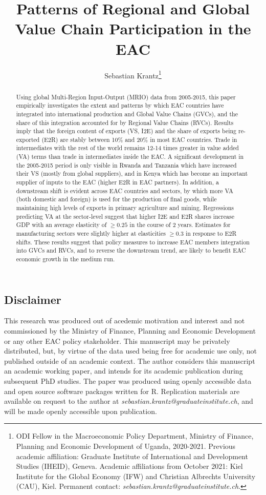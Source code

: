 \documentclass[a4paper]{article}
\title{\textbf{Patterns of Regional and Global Value Chain Participation in the EAC}}
\author{Sebastian Krantz\footnote{ODI Fellow in the Macroeconomic Policy Department, Ministry of Finance, Planning and Economic Development of Uganda, 2020-2021. Previous academic affiliation: Graduate Institute of International and Development Studies (IHEID), Geneva. Academic affiliations from October 2021: Kiel Institute for the Global Economy (IFW) and Christian Albrechts University (CAU), Kiel. Permanent contact: \emph{sebastian.krantz@graduateinstitute.ch}.}}
\begin{document}
\maketitle

\begin{abstract}
Using global Multi-Region Input-Output (MRIO) data from 2005-2015, this paper empirically investigates the extent and patterns by which EAC countries have integrated into international production and Global Value Chains (GVCs), and the share of this integration accounted for by Regional Value Chains (RVCs). Results imply that the foreign content of exports (VS, I2E) and the share of exports being re-exported (E2R) are stably between 10\% and 20\% in most EAC countries. Trade in intermediates with the rest of the world remains 12-14 times greater in value added (VA) terms than trade in intermediates inside the EAC. A significant development in the 2005-2015 period is only visible in Rwanda and Tanzania which have increased their VS (mostly from global suppliers), and in Kenya which has become an important supplier of inputs to the EAC (higher E2R in EAC partners). In addition, a downstream shift is evident across EAC countries and sectors, by which more VA (both domestic and foreign) is used for the production of final goods, while maintaining high levels of exports in primary agriculture and mining. Regressions predicting VA at the sector-level suggest that higher I2E and E2R shares increase GDP with an average elasticity of $\geq 0.25$ in the course of 2 years. Estimates for manufacturing sectors were slightly higher at elasticities $\geq 0.3$ in response to E2R shifts. These results suggest that policy measures to increase EAC members integration into GVCs and RVCs, and to reverse the downstream trend, are likely to benefit EAC economic growth in the medium run.  
\end{abstract}

\vspace{4.8cm}

\subsection*{Disclaimer}
This research was produced out of acedemic motivation and interest and not commissioned by the  Ministry of Finance, Planning and Economic Development or any other EAC policy stakeholder. This manuscript may be privately distributed, but, by virtue of the data used being free for academic use only, not published outside of an academic context. The author considers this manuscript an academic working paper, and intends for its academic publication during subsequent PhD studies. The paper was produced using openly accessible data and open source software packages written for R. Replication materials are available on request to the author at  \emph{sebastian.krantz@graduateinstitute.ch}, and will be made openly accessible upon publication. 
\end{document}
